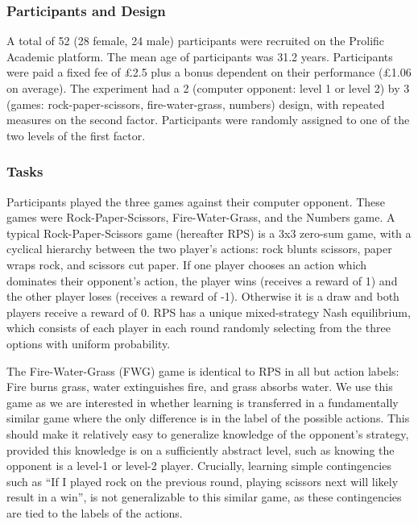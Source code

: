 \documentclass[smallextended]{svjour3}       %
\begin{document}
\hypertarget{participants-and-design}{%
\subsubsection{Participants and Design}\label{participants-and-design}}

A total of 52 (28 female, 24 male) participants were recruited on the
Prolific Academic platform. The mean age of participants was 31.2 years.
Participants were paid a fixed fee of £2.5 plus a bonus dependent on
their performance (£1.06 on average). The experiment had a 2 (computer
opponent: level 1 or level 2) by 3 (games: rock-paper-scissors,
fire-water-grass, numbers) design, with repeated measures on the second
factor. Participants were randomly assigned to one of the two levels of
the first factor.

\hypertarget{tasks}{%
\subsubsection{Tasks}\label{tasks}}

Participants played the three games against their computer opponent.
These games were Rock-Paper-Scissors, Fire-Water-Grass, and the Numbers
game. A typical Rock-Paper-Scissors game (hereafter RPS) is a 3x3
zero-sum game, with a cyclical hierarchy between the two player's
actions: rock blunts scissors, paper wraps rock, and scissors cut paper.
If one player chooses an action which dominates their opponent's action,
the player wins (receives a reward of 1) and the other player loses
(receives a reward of -1). Otherwise it is a draw and both players
receive a reward of 0. RPS has a unique mixed-strategy Nash equilibrium,
which consists of each player in each round randomly selecting from the
three options with uniform probability.

The Fire-Water-Grass (FWG) game is identical to RPS in all but action
labels: Fire burns grass, water extinguishes fire, and grass absorbs
water. We use this game as we are interested in whether learning is
transferred in a fundamentally similar game where the only difference is
in the label of the possible actions. This should make it relatively
easy to generalize knowledge of the opponent's strategy, provided this
knowledge is on a sufficiently abstract level, such as knowing the
opponent is a level-1 or level-2 player. Crucially, learning simple
contingencies such as ``If I played rock on the previous round, playing
scissors next will likely result in a win'', is not generalizable to
this similar game, as these contingencies are tied to the labels of the
actions.
\end{document}

